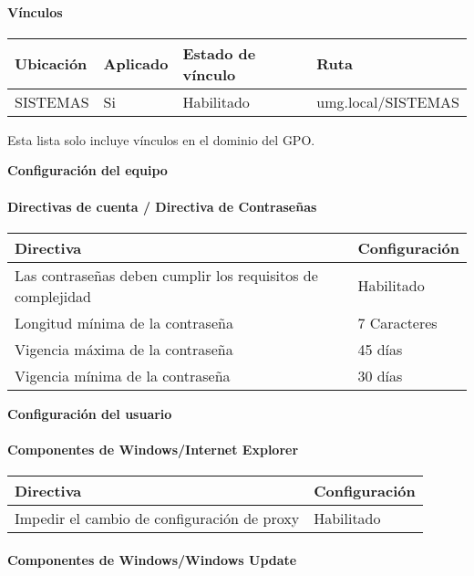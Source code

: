 \documentclass[
]{article}
\begin{document}
\hypertarget{vuxednculos-3}{%
\paragraph{Vínculos}\label{vuxednculos-3}}

\begin{longtable}[]{@{}llll@{}}
\toprule
\textbf{Ubicación} & \textbf{Aplicado} & \textbf{Estado de vínculo} &
\textbf{Ruta}\tabularnewline
\midrule
\endhead
SISTEMAS & Si & Habilitado & umg.local/SISTEMAS\tabularnewline
\bottomrule
\end{longtable}

Esta lista solo incluye vínculos en el dominio del GPO.

\textbf{Configuración del equipo}

\hypertarget{directivas-de-cuenta-directiva-de-contraseuxf1as-2}{%
\paragraph{Directivas de cuenta / Directiva de
Contraseñas}\label{directivas-de-cuenta-directiva-de-contraseuxf1as-2}}

\begin{longtable}[]{@{}ll@{}}
\toprule
\textbf{Directiva} & \textbf{Configuración}\tabularnewline
\midrule
\endhead
Las contraseñas deben cumplir los requisitos de complejidad &
Habilitado\tabularnewline
Longitud mínima de la contraseña & 7 Caracteres\tabularnewline
Vigencia máxima de la contraseña & 45 días\tabularnewline
Vigencia mínima de la contraseña & 30 días\tabularnewline
\bottomrule
\end{longtable}

\textbf{Configuración del usuario}

\hypertarget{componentes-de-windowsinternet-explorer-1}{%
\paragraph{Componentes de Windows/Internet
Explorer}\label{componentes-de-windowsinternet-explorer-1}}

\begin{longtable}[]{@{}ll@{}}
\toprule
\textbf{Directiva} & \textbf{Configuración}\tabularnewline
\midrule
\endhead
Impedir el cambio de configuración de proxy & Habilitado\tabularnewline
\bottomrule
\end{longtable}

\hypertarget{componentes-de-windowswindows-update-2}{%
\paragraph{Componentes de Windows/Windows
Update}\label{componentes-de-windowswindows-update-2}}
\end{document}
